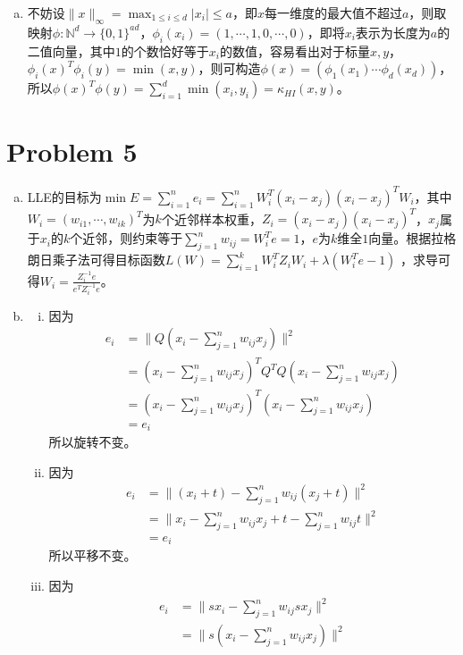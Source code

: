 \documentclass[a4paper,UTF8]{article}
\numberwithin{equation}{section}
\begin{document}
\begin{enumerate}[(a)]
    \item 不妨设$\|x\|_\infty=\max_{1\leq i\leq d}|x_i| \leq a$，即$x$每一维度的最大值不超过$a$，则取映射$\phi:\mathbb{N}^d\rightarrow \{0,1\}^{ad}$，$\phi_i(x_i)=(1,\cdots,1,0,\cdots,0)$，即将$x_i$表示为长度为$a$的二值向量，其中$1$的个数恰好等于$x_i$的数值，容易看出对于标量$x,y$，$\phi_i(x)^T\phi_i(y)=\min(x,y)$，则可构造$\phi(x)=(\phi_1(x_1)\cdots \phi_d(x_d))$，所以$\phi(x)^T\phi(y)=\sum_{i=1}^d\min(x_i,y_i)=\kappa_{HI}(x,y)$。
\end{enumerate}

\section*{Problem 5}
\begin{enumerate}[(a)]
    \item LLE的目标为$\min E=\sum_{i=1}^n e_i=\sum_{i=1}^n W_i^T(x_i-x_j)(x_i-x_j)^TW_i$，其中$W_i=(w_{i1},\cdots,w_{ik})^T$为$k$个近邻样本权重，$Z_i=(x_i-x_j)(x_i-x_j)^T$，$x_j$属于$x_i$的$k$个近邻，则约束等于$\sum_{j=1}^nw_{ij}=W_i^Te=1$，$e$为$k$维全$1$向量。根据拉格朗日乘子法可得目标函数$L(W)=\sum_{i=1}^kW_i^TZ_iW_i+\lambda (W_i^Te-1)$
    ，求导可得$W_i=\frac{Z_i^{-1}e}{e^TZ_i^{-1}e}$。
    \item \begin{enumerate}[i.]
             \item 因为\begin{align*}
                 e_i&=\|Q(x_i-\sum_{j=1}^nw_{ij}x_j)\|^2\\
                 &=(x_i-\sum_{j=1}^nw_{ij}x_j)^TQ^TQ(x_i-\sum_{j=1}^nw_{ij}x_j)\\
                 &=(x_i-\sum_{j=1}^nw_{ij}x_j)^T(x_i-\sum_{j=1}^nw_{ij}x_j)\\&=e_i
             \end{align*}
             所以旋转不变。
             \item 因为\begin{align*}
                 e_i&=\|(x_i+t)-\sum_{j=1}^nw_{ij}(x_j+t)\|^2\\
                 &=\|x_i-\sum_{j=1}^nw_{ij}x_j+t-\sum_{j=1}^nw_{ij}t\|^2\\
                 &=e_i
             \end{align*}
             所以平移不变。
             \item 因为\begin{align*}
                 e_i&=\|sx_i-\sum_{j=1}^nw_{ij}sx_j\|^2\\
                 &=\|s(x_i-\sum_{j=1}^nw_{ij}x_j)\|^2\\

\end{align*}
\end{enumerate}
\end{enumerate}
\end{document}
